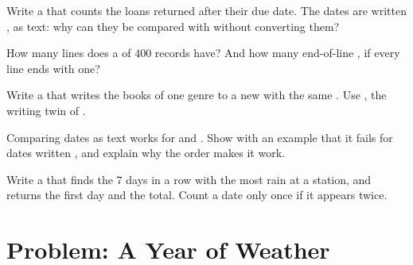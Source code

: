 \begin{exercise}[$\star\star$]\label{exo:g8:files-and-data-tables:8}
Write a   that counts the loans returned
after their due date. The dates are written , as text: why
can they be compared with \code{>} without converting them?
\end{exercise}

\begin{exercise}[$\star\star$]\label{exo:g8:files-and-data-tables:9}
How many lines does a  of 400 records have? And how many end-of-line
, if every line ends with one?
\end{exercise}

\begin{exercise}[$\star\star\star$]\label{exo:g8:files-and-data-tables:10}
Write a   that writes the
books of one genre to a new  with the same . Use
, the writing twin of .
\end{exercise}

\begin{exercise}[$\star\star\star$]\label{exo:g8:files-and-data-tables:11}
Comparing dates as text works for  and .
Show with an example that it fails for dates written , and
explain why the order  makes it work.
\end{exercise}

\begin{exercise}[$\star\star\star$]\label{exo:g8:files-and-data-tables:12}
Write a   that finds the 7 days in a
row with the most rain at a station, and returns the first day and the total.
Count a date only once if it appears twice.
\end{exercise}

\section{Problem: A Year of Weather}

